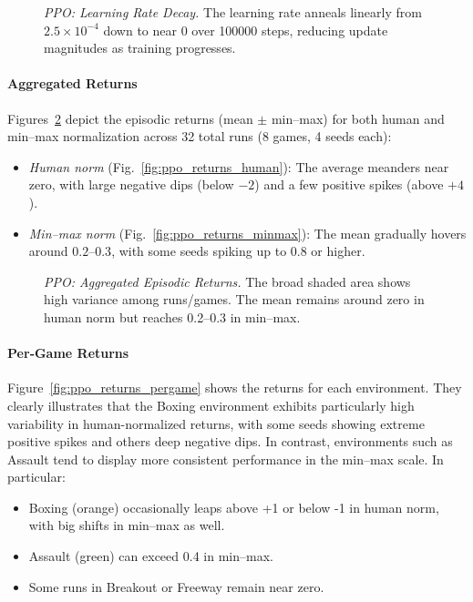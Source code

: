 \begin{figure} 
	\centering
	
	\caption{\emph{PPO: Learning Rate Decay.}
		The learning rate anneals linearly from $2.5\times10^{-4}$ down to near $0$ 
		over \num{100000} steps, reducing update magnitudes as training progresses.}
	\label{fig:ppo_lr}
\end{figure}

\paragraph{Aggregated Returns}
Figures~\ref{fig:ppo_returns_agg} depict the episodic returns (mean $\pm$ min--max) 
for both human and min--max normalization across 32 total runs (8 games, 4 seeds each):
\begin{itemize}
	\item \emph{Human norm} 
	(Fig.~\ref{fig:ppo_returns_human}): The average meanders near zero, with large 
	negative dips (below $-2$) and a few positive spikes (above $+4$).
	\item \emph{Min--max norm}
	(Fig.~\ref{fig:ppo_returns_minmax}): The mean gradually hovers around $0.2$--$0.3$, 
	with some seeds spiking up to $0.8$ or higher.
\end{itemize}

\begin{figure}
	\centering
	\quad
	\caption{\emph{PPO: Aggregated Episodic Returns.} 
		The broad shaded area shows high variance among runs/games. 
		The mean remains around zero in human norm but reaches 0.2--0.3 in min--max.}
	\label{fig:ppo_returns_agg}
\end{figure}

\paragraph{Per‐Game Returns}
Figure~\ref{fig:ppo_returns_pergame} shows the returns for each environment. They clearly illustrates that the Boxing environment exhibits particularly high variability in human-normalized returns, with some seeds showing extreme positive spikes and others deep negative dips. In contrast, environments such as Assault tend to display more consistent performance in the min--max scale. In particular:
\begin{itemize}
	\item Boxing (orange) occasionally leaps above +1 or below -1 in human norm,
	with big shifts in min--max as well.
	\item Assault (green) can exceed 0.4 in min--max.
	\item Some runs in Breakout or Freeway remain near zero.
\end{itemize}

